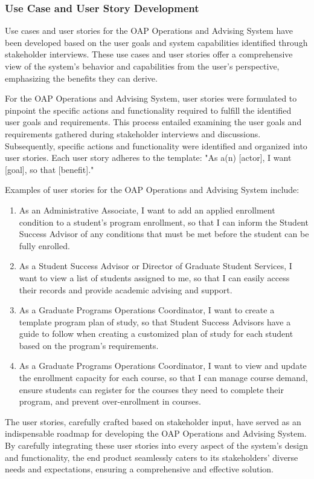 \documentclass[12pt]{article}
\begin{document}
\subsubsection{Use Case and User Story Development}
Use cases and user stories for the OAP Operations and Advising System have been developed based on the user goals and system capabilities identified through stakeholder interviews. These use cases and user stories offer a comprehensive view of the system's behavior and capabilities from the user's perspective, emphasizing the benefits they can derive.

For the OAP Operations and Advising System, user stories were formulated to pinpoint the specific actions and functionality required to fulfill the identified user goals and requirements. This process entailed examining the user goals and requirements gathered during stakeholder interviews and discussions. Subsequently, specific actions and functionality were identified and organized into user stories. Each user story adheres to the template: "As a(n) [actor], I want [goal], so that [benefit]."

Examples of user stories for the OAP Operations and Advising System include:
\begin{enumerate}[label=(\roman*)]
    \item As an Administrative Associate, I want to add an applied enrollment condition to a student's program enrollment, so that I can inform the Student Success Advisor of any conditions that must be met before the student can be fully enrolled.
    \item As a Student Success Advisor or Director of Graduate Student Services, I want to view a list of students assigned to me, so that I can easily access their records and provide academic advising and support.
    \item As a Graduate Programs Operations Coordinator, I want to create a template program plan of study, so that Student Success Advisors have a guide to follow when creating a customized plan of study for each student based on the program's requirements.
    \item As a Graduate Programs Operations Coordinator, I want to view and update the enrollment capacity for each course, so that I can manage course demand, ensure students can register for the courses they need to complete their program, and prevent over-enrollment in courses.
\end{enumerate}

The user stories, carefully crafted based on stakeholder input, have served as an indispensable roadmap for developing the OAP Operations and Advising System. By carefully integrating these user stories into every aspect of the system's design and functionality, the end product seamlessly caters to its stakeholders' diverse needs and expectations, ensuring a comprehensive and effective solution.
\end{document}
